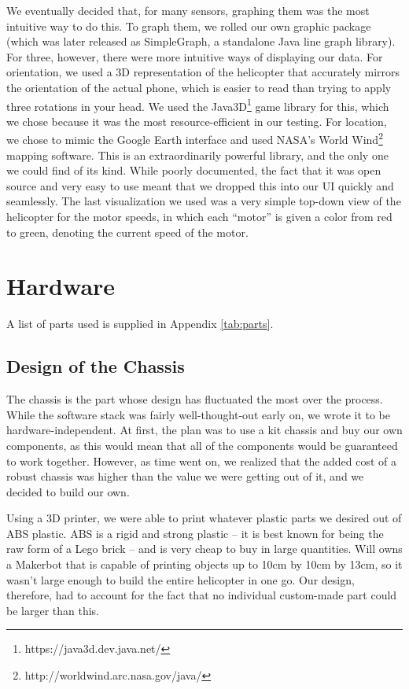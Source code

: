 \documentclass[letterpaper]{article}
\begin{document}
We eventually decided that, for many sensors, graphing them was the
most intuitive way to do this. To graph them, we rolled our own
graphic package (which was later released as SimpleGraph, a standalone
Java line graph library). For three, however, there were more
intuitive ways of displaying our data. For orientation, we used a 3D
representation of the helicopter that accurately mirrors the
orientation of the actual phone, which is easier to read than trying
to apply three rotations in your head. We used the
Java3D\footnote{https://java3d.dev.java.net/} game library for this,
which we chose because it was the most resource-efficient in our
testing. For location, we chose to mimic the Google Earth interface
and used NASA's World
Wind\footnote{http://worldwind.arc.nasa.gov/java/} mapping
software. This is an extraordinarily powerful library, and the only
one we could find of its kind. While poorly documented, the fact that
it was open source and very easy to use meant that we dropped this
into our UI quickly and seamlessly. The last visualization we used was
a very simple top-down view of the helicopter for the motor speeds, in
which each ``motor'' is given a color from red to green, denoting the
current speed of the motor.

\section{Hardware}
A list of parts used is supplied in Appendix \ref{tab:parts}.

\subsection{Design of the Chassis}
The chassis is the part whose design has fluctuated the most over the
process. While the software stack was fairly well-thought-out early
on, we wrote it to be hardware-independent. At first, the plan was to
use a kit chassis and buy our own components, as this would mean that
all of the components would be guaranteed to work together. However,
as time went on, we realized that the added cost of a robust chassis
was higher than the value we were getting out of it, and we decided to
build our own.

Using a 3D printer, we were able to print whatever plastic parts we
desired out of ABS plastic. ABS is a rigid and strong plastic -- it is
best known for being the raw form of a Lego brick -- and is very cheap
to buy in large quantities. Will owns a Makerbot that is capable of
printing objects up to 10cm by 10cm by 13cm, so it wasn't large enough
to build the entire helicopter in one go. Our design, therefore, had
to account for the fact that no individual custom-made part could be
larger than this.
\end{document}
